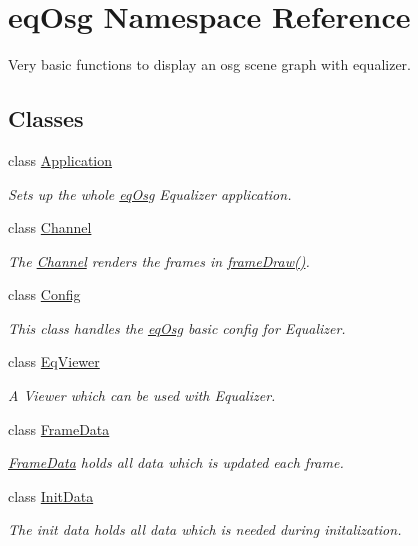 \hypertarget{a00044}{
\section{eqOsg Namespace Reference}
\label{a00044}
}
Very basic functions to display an osg scene graph with equalizer.  


\subsection*{Classes}
\begin{CompactItemize}
\item 
class \hyperlink{a00001}{Application}
\begin{CompactList}\small\item\em Sets up the whole \hyperlink{a00044}{eqOsg} Equalizer application. \item\end{CompactList}\item 
class \hyperlink{a00002}{Channel}
\begin{CompactList}\small\item\em The \hyperlink{a00002}{Channel} renders the frames in \hyperlink{a00002_70cfd22742da9b9aa3e3478f356ba220}{frameDraw()}. \item\end{CompactList}\item 
class \hyperlink{a00003}{Config}
\begin{CompactList}\small\item\em This class handles the \hyperlink{a00044}{eqOsg} basic config for Equalizer. \item\end{CompactList}\item 
class \hyperlink{a00009}{EqViewer}
\begin{CompactList}\small\item\em A Viewer which can be used with Equalizer. \item\end{CompactList}\item 
class \hyperlink{a00010}{FrameData}
\begin{CompactList}\small\item\em \hyperlink{a00010}{FrameData} holds all data which is updated each frame. \item\end{CompactList}\item 
class \hyperlink{a00011}{InitData}
\begin{CompactList}\small\item\em The init data holds all data which is needed during initalization. \item\end{CompactList}\item 

\end{CompactItemize}
